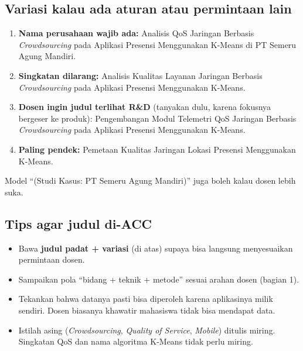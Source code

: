 \documentclass[11pt,a4paper]{article}
\begin{document}
\subsection{Variasi kalau ada aturan atau permintaan lain}
\begin{enumerate}
\item \textbf{Nama perusahaan wajib ada:} Analisis QoS Jaringan Berbasis \textit{Crowdsourcing} pada Aplikasi Presensi Menggunakan K-Means di PT Semeru Agung Mandiri.
\item \textbf{Singkatan dilarang:} Analisis Kualitas Layanan Jaringan Berbasis \textit{Crowdsourcing} pada Aplikasi Presensi Menggunakan K-Means.
\item \textbf{Dosen ingin judul terlihat R\&D} (tanyakan dulu, karena fokusnya bergeser ke produk): Pengembangan Modul Telemetri QoS Jaringan Berbasis \textit{Crowdsourcing} pada Aplikasi Presensi Menggunakan K-Means.
\item \textbf{Paling pendek:} Pemetaan Kualitas Jaringan Lokasi Presensi Menggunakan K-Means.
\end{enumerate}
Model ``(Studi Kasus: PT Semeru Agung Mandiri)'' juga boleh kalau dosen lebih suka.

\subsection{Tips agar judul di-ACC}
\begin{itemize}
\item Bawa \textbf{judul padat + variasi} (di atas) supaya bisa langsung menyesuaikan permintaan dosen.
\item Sampaikan pola ``bidang + teknik + metode'' sesuai arahan dosen (bagian 1).
\item Tekankan bahwa datanya pasti bisa diperoleh karena aplikasinya milik sendiri. Dosen biasanya khawatir mahasiswa tidak bisa mendapat data.
\item Istilah asing (\textit{Crowdsourcing}, \textit{Quality of Service}, \textit{Mobile}) ditulis miring. Singkatan QoS dan nama algoritma K-Means tidak perlu miring.
\end{itemize}

\end{document}
